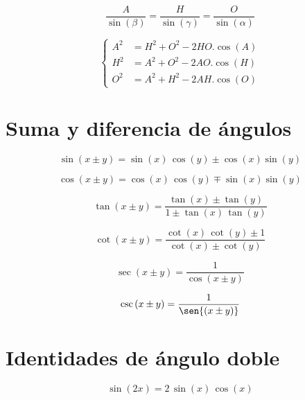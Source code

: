 \begin{equation*}
    \frac{A}{\sin{(\beta)}} = \frac{H}{\sin{(\gamma)}} = \frac{O}{\sin{(\alpha)}}
\end{equation*}

\begin{equation*}
    \left\{
    \begin{aligned}
        A^2 &= H^2+O^2-2HO.\cos{(A)}
        \\
        H^2 &= A^2+O^2-2AO.\cos{(H)}
        \\
        O^2 &= A^2+H^2-2AH.\cos{(O)}
    \end{aligned}
    \right.
\end{equation*}


\section{Suma y diferencia de ángulos}

\begin{equation*}
    \sin{(x \pm y)} = \sin{(x)} \, \cos{(y)} \pm \cos{(x)}\sin{(y)}
\end{equation*}

\begin{equation*}
    \cos{(x \pm y)} = \cos{(x)} \, \cos{(y)} \mp \sin{(x)}\sin{(y)}
\end{equation*}

\begin{equation*}
    \tan{(x \pm y)} = \dfrac{\tan{(x)} \pm \tan{(y)}}{1 \pm \tan{(x)} \, \tan{(y)}}
\end{equation*}

\begin{equation*}
    \cot{(x \pm y)} = \dfrac{\cot{(x)} \, \cot{(y)} \pm1}{\cot{(x)} \pm \cot{(y)}}
\end{equation*}

\begin{equation*}
    \sec{(x \pm y)} = \dfrac{1}{\cos{(x \pm y)}}
\end{equation*}

\begin{equation*}
    \csc{(x \pm y)} = \dfrac{1}{\sen{(x \pm y)}}
\end{equation*}


\section{Identidades de ángulo doble}

\begin{equation*}
    \sin{(2x)}=2 \, \sin{(x)} \, \cos{(x)}
\end{equation*}

